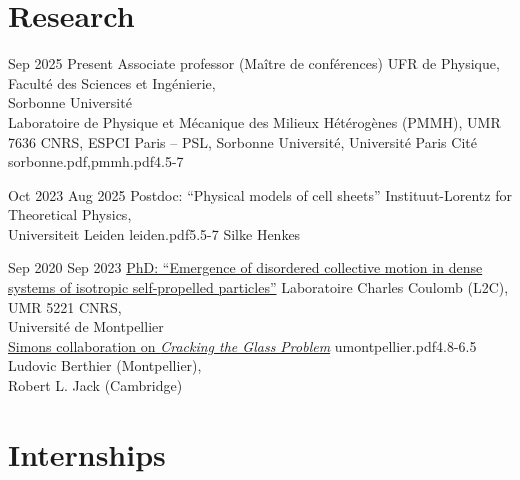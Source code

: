 \documentclass[a4paper]{cvtemplate_en} %
\begin{document}
\makeprofile %


\vspace{2mm}
\section{Research}

\begin{cvbody}

\cvitem
	{Sep 2025}
	{Present}
  {Associate professor (Ma\^itre de conf\'erences)}
  {UFR de Physique, Facult\'e des Sciences et Ing\'enierie,\\ Sorbonne Universit\'e \\ Laboratoire de Physique et M\'ecanique des Milieux H\'et\'erog\`enes (PMMH), UMR 7636 CNRS, ESPCI Paris -- PSL, Sorbonne Universit\'e, Universit\'e Paris Cit\'e }
  {sorbonne.pdf,pmmh.pdf}{4.5}{-7}
	{}
  {\\[-20pt]}

\cvitem
	{Oct 2023}
	{Aug 2025}
  {Postdoc: ``Physical models of cell sheets''}
  {Instituut-Lorentz for Theoretical Physics,\\ Universiteit Leiden }
  {leiden.pdf}{5.5}{-7}
	{Silke Henkes}
  {\\[15pt]}

\cvitem
	{Sep 2020}
	{Sep 2023}
  {\href{https://theses.hal.science/tel-04530690v1}{PhD: ``Emergence of disordered collective motion in dense systems of isotropic self-propelled particles''}}
  {Laboratoire Charles Coulomb (L2C), UMR 5221 CNRS,\\ Universit\'e de Montpellier \\
  \href{https://scglass.uchicago.edu}{Simons collaboration on \textit{Cracking the Glass Problem}}}
  {umontpellier.pdf}{4.8}{-6.5}
	{Ludovic Berthier (Montpellier),\\ Robert L. Jack (Cambridge)}
  {\\}

\end{cvbody}

\section{Internships}
\end{document}
